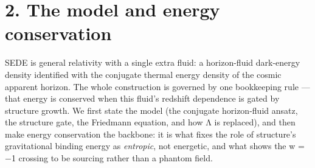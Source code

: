 \documentclass[
  10pt,
]{article}
\begin{document}
\section{2. The model and energy
conservation}\label{the-model-and-energy-conservation}

SEDE is general relativity with a single extra fluid: a horizon-fluid
dark-energy density identified with the conjugate thermal energy density
of the cosmic apparent horizon. The whole construction is governed by
one bookkeeping rule --- that energy is conserved when this fluid's
redshift dependence is gated by structure growth. We first state the
model (the conjugate horizon-fluid ansatz, the structure gate, the
Friedmann equation, and how Λ is replaced), and then make energy
conservation the backbone: it is what fixes the role of structure's
gravitational binding energy as \emph{entropic}, not energetic, and what
shows the w = −1 crossing to be sourcing rather than a phantom field.
\end{document}
